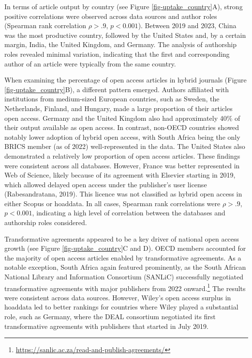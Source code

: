 \documentclass[a4paper,man,floatsintext,longtable,noextraspace,10pt]{apa6}
\begin{document}
In terms of article output by country (see Figure
\ref{fig-uptake_country}A), strong positive correlations were observed
across data sources and author roles (Spearman rank correlation
\(\rho > .9\), \(p < 0.001\)). Between 2019 and 2023, China was the most
productive country, followed by the United States and, by a certain
margin, India, the United Kingdom, and Germany. The analysis of
authorship roles revealed minimal variation, indicating that the first
and corresponding author of an article were typically from the same
country.

When examining the percentage of open access articles in hybrid journals
(Figure \ref{fig-uptake_country}B), a different pattern emerged. Authors
affiliated with institutions from medium-sized European countries, such
as Sweden, the Netherlands, Finland, and Hungary, made a large
proportion of their articles open access. Germany and the United Kingdom
also had approximately 40\% of their output available as open access. In
contrast, non-OECD countries showed notably lower adoption of hybrid
open access, with South Africa being the only BRICS member (as of 2022)
well-represented in the data. The United States also demonstrated a
relatively low proportion of open access articles. These findings were
consistent across all databases. However, France was better represented
in Web of Science, likely because of its agreement with Elsevier
starting in 2019, which allowed delayed open access under the
publisher's user license (Rabesandratana, 2019). This licence was not
classified as hybrid open access in either Scopus or hoaddata. In all
cases, Spearman rank correlations were \(\rho > .9\), \(p < 0.001\),
indicating a high level of correlation between the databases and
authorship roles considered.

Transformative agreements appeared to be a key driver of national open
access growth (see Figure \ref{fig-uptake_country}C and D). OECD members
accounted for the majority of open access articles enabled by
transformative agreements. As a notable exception, South Africa again
featured prominently, as the South African National Library and
Information Consortium (SANLiC) successfully negotiated transformative
agreements with major publishers from 2022 onward.\footnote{\url{https://sanlic.ac.za/read-and-publish-agreements/}}
The results were consistent across data sources. However, Wiley's open
access surplus in hoaddata led to better rankings for countries where
Wiley played a substantial role, such as Germany, where the DEAL
consortium negotiated its first transformative agreements with
publishers that started in July 2019.
\end{document}
